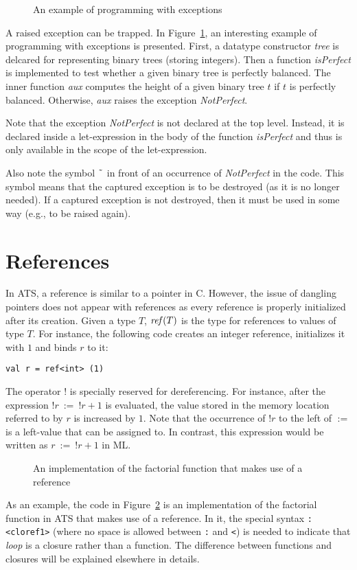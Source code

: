 \begin{figure}[thp]

\caption{An example of programming with exceptions}
\label{figure:isPerfect}
\end{figure}
A raised exception can be trapped.  In Figure~\ref{figure:isPerfect}, an
interesting example of programming with exceptions is presented. First, a
datatype constructor {\it tree} is delcared for representing binary trees
(storing integers). Then a function {\it isPerfect} is implemented to test
whether a given binary tree is perfectly balanced.  The inner function {\it
aux} computes the height of a given binary tree $t$ if $t$ is perfectly
balanced. Otherwise, {\it aux} raises the exception {\it NotPerfect}.

Note that the exception {\it NotPerfect} is not declared at the top
level. Instead, it is declared inside a let-expression in the body of the
function {\it isPerfect} and thus is only available in the scope of the
let-expression.

Also note the symbol $\char126$ in front of an occurrence of {\it
NotPerfect} in the code.  This symbol means that the captured exception is
to be destroyed (as it is no longer needed). If a captured exception is not
destroyed, then it must be used in some way (e.g., to be raised again).

\section{References}
In ATS, a reference is similar to a pointer in C. However, the issue of
dangling pointers does not appear with references as every reference is
properly initialized after its creation.  Given a type $T$, ${\it ref}(T)$ is
the type for references to values of type $T$. For instance, the following
code creates an integer reference, initializes it with $1$ and binds $r$ to
it:
\begin{verbatim}
val r = ref<int> (1)
\end{verbatim}
The operator $!$ is specially reserved for dereferencing.  For
instance, after the expression $!r~:=~!r + 1$ is evaluated, the value
stored in the memory location referred to by $r$ is increased by $1$. Note
that the occurrence of $!r$ to the left of $:=$ is a left-value that can be
assigned to.  In contrast, this expression would be written as $r~:=~!r +
1$ in ML.

\begin{figure}[thp]

\caption{An implementation of the factorial function that makes use of a reference}
\label{figure:ref_factorial}
\end{figure}
As an example, the code in Figure~\ref{figure:ref_factorial} is an
implementation of the factorial function in ATS that makes use of a
reference. In it, the special syntax \verb`:<cloref1>` (where no space is
allowed between \verb`:` and \verb`<`) is needed to indicate that {\it
loop} is a closure rather than a function.  The difference between
functions and closures will be explained elsewhere in details.

